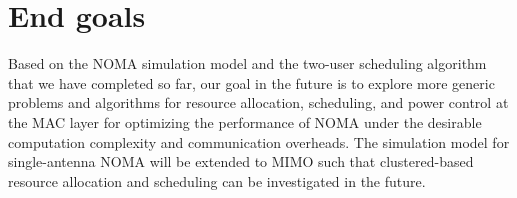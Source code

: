 \section{End goals}
\label{sec_end_goals}
Based on the NOMA simulation model and the two-user
scheduling algorithm that we have completed so far, our goal in
the future is to explore more generic problems and algorithms
for resource allocation, scheduling, and power control at the
MAC layer for optimizing the performance of NOMA under the
desirable computation complexity and communication overheads.
The simulation model for single-antenna NOMA will be extended to
MIMO such that clustered-based resource allocation and
scheduling can be investigated in the future.

